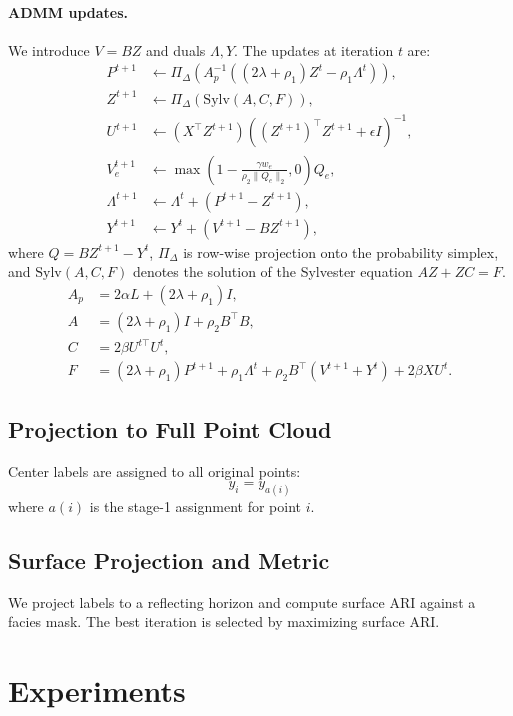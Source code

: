 \documentclass{article}
\begin{document}
\paragraph{ADMM updates.}
We introduce $V = BZ$ and duals $\Lambda, Y$. The updates at iteration $t$ are:
\begin{align}
P^{t+1} &\leftarrow \Pi_{\Delta}\!\left(A_p^{-1}\left((2\lambda+\rho_1)Z^t - \rho_1 \Lambda^t\right)\right), \\
Z^{t+1} &\leftarrow \Pi_{\Delta}\!\left(\mathrm{Sylv}(A, C, F)\right), \\
U^{t+1} &\leftarrow (X^\top Z^{t+1})\left((Z^{t+1})^\top Z^{t+1} + \epsilon I\right)^{-1}, \\
V^{t+1}_e &\leftarrow \max\!\left(1 - \frac{\gamma w_e}{\rho_2 \lVert Q_e \rVert_2}, 0\right) Q_e, \\
\Lambda^{t+1} &\leftarrow \Lambda^t + (P^{t+1} - Z^{t+1}), \\
Y^{t+1} &\leftarrow Y^t + (V^{t+1} - BZ^{t+1}),
\end{align}
where $Q = BZ^{t+1} - Y^t$, $\Pi_{\Delta}$ is row-wise projection onto the probability simplex, and $\mathrm{Sylv}(A,C,F)$ denotes the solution of the Sylvester equation $A Z + Z C = F$.
\begin{align}
A_p &= 2\alpha L + (2\lambda + \rho_1)I,\\
A &= (2\lambda + \rho_1)I + \rho_2 B^\top B,\\
C &= 2\beta U^{t\top} U^t,\\
F &= (2\lambda + \rho_1)P^{t+1} + \rho_1 \Lambda^t + \rho_2 B^\top (V^{t+1} + Y^t) + 2\beta XU^t.
\end{align}

\subsection{Projection to Full Point Cloud}
Center labels are assigned to all original points:
\[
y_i = y_{a(i)}
\]
where $a(i)$ is the stage-1 assignment for point $i$.

\subsection{Surface Projection and Metric}
We project labels to a reflecting horizon and compute surface ARI against a facies mask. The best iteration is selected by maximizing surface ARI.

\section{Experiments}
\end{document}
